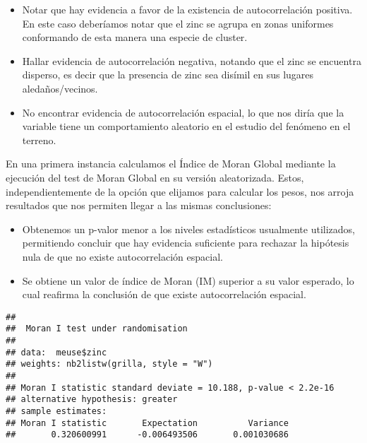 \documentclass[
  12pt,
]{article}
\newenvironment{Shaded}{\begin{snugshade}}{\end{snugshade}}
\newcommand{\AttributeTok}[1]{\textcolor[rgb]{0.77,0.63,0.00}{#1}}
\newcommand{\ConstantTok}[1]{\textcolor[rgb]{0.00,0.00,0.00}{#1}}
\newcommand{\FunctionTok}[1]{\textcolor[rgb]{0.00,0.00,0.00}{#1}}
\newcommand{\NormalTok}[1]{#1}
\newcommand{\SpecialCharTok}[1]{\textcolor[rgb]{0.00,0.00,0.00}{#1}}
\newcommand{\StringTok}[1]{\textcolor[rgb]{0.31,0.60,0.02}{#1}}
\begin{document}
\begin{itemize}
\item
  Notar que hay evidencia a favor de la existencia de autocorrelación
  positiva. En este caso deberíamos notar que el zinc se agrupa en zonas
  uniformes conformando de esta manera una especie de cluster.
\item
  Hallar evidencia de autocorrelación negativa, notando que el zinc se
  encuentra disperso, es decir que la presencia de zinc sea disímil en
  sus lugares aledaños/vecinos.
\item
  No encontrar evidencia de autocorrelación espacial, lo que nos diría
  que la variable tiene un comportamiento aleatorio en el estudio del
  fenómeno en el terreno.
\end{itemize}

En una primera instancia calculamos el Índice de Moran Global mediante
la ejecución del test de Moran Global en su versión aleatorizada. Estos,
independientemente de la opción que elijamos para calcular los pesos,
nos arroja resultados que nos permiten llegar a las mismas conclusiones:

\begin{itemize}
\item
  Obtenemos un p-valor menor a los niveles estadísticos usualmente
  utilizados, permitiendo concluir que hay evidencia suficiente para
  rechazar la hipótesis nula de que no existe autocorrelación espacial.
\item
  Se obtiene un valor de índice de Moran (IM) superior a su valor
  esperado, lo cual reafirma la conclusión de que existe autocorrelación
  espacial.
\end{itemize}

\begin{Shaded}
\end{Shaded}

\begin{verbatim}
## 
##  Moran I test under randomisation
## 
## data:  meuse$zinc  
## weights: nb2listw(grilla, style = "W")    
## 
## Moran I statistic standard deviate = 10.188, p-value < 2.2e-16
## alternative hypothesis: greater
## sample estimates:
## Moran I statistic       Expectation          Variance 
##       0.320600991      -0.006493506       0.001030686
\end{verbatim}
\end{document}

